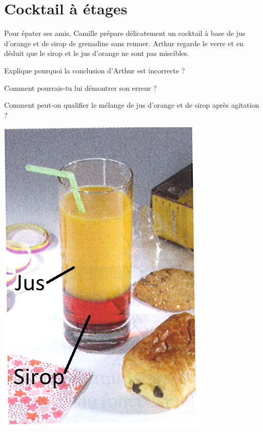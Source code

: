 \section{Cocktail à étages}


\begin{multicols}{2}
	Pour épater ses amis, Camille prépare délicatement un cocktail à base de jus d'orange et de sirop de grenadine sans remuer. Arthur regarde le verre et en déduit que le sirop et le jus d'orange ne sont pas miscibles.
	
	\begin{questions}
		\question Explique pourquoi la conclusion d'Arthur est incorrecte ?
		
		\question Comment pourrais-tu lui démontrer son erreur ?
		
		\question Comment peut-on qualifier le mélange de jus d'orange et de sirop après agitation ?
	\end{questions}

	\begin{center}
		\includegraphics[scale=0.4]{img/jus}
	\end{center}
\end{multicols}